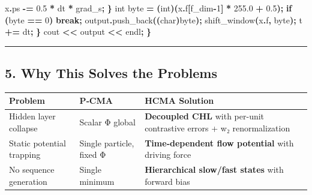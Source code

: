 \documentclass[
  11pt,
  a4paper,
]{article}
\newenvironment{Shaded}{\begin{snugshade}}{\end{snugshade}}
\newcommand{\ControlFlowTok}[1]{\textcolor[rgb]{0.13,0.29,0.53}{\textbf{#1}}}
\newcommand{\DataTypeTok}[1]{\textcolor[rgb]{0.13,0.29,0.53}{#1}}
\newcommand{\DecValTok}[1]{\textcolor[rgb]{0.00,0.00,0.81}{#1}}
\newcommand{\FloatTok}[1]{\textcolor[rgb]{0.00,0.00,0.81}{#1}}
\newcommand{\NormalTok}[1]{#1}
\newcommand{\OperatorTok}[1]{\textcolor[rgb]{0.81,0.36,0.00}{\textbf{#1}}}
\begin{document}
\begin{Shaded}
\begin{Highlighting}[]
\NormalTok{            x}\OperatorTok{.}\NormalTok{ps }\OperatorTok{{-}=} \FloatTok{0.5} \OperatorTok{*}\NormalTok{ dt }\OperatorTok{*}\NormalTok{ grad\_s}\OperatorTok{;}
        \OperatorTok{\}}
        \DataTypeTok{int}\NormalTok{ byte }\OperatorTok{=} \OperatorTok{(}\DataTypeTok{int}\OperatorTok{)(}\NormalTok{x}\OperatorTok{.}\NormalTok{f}\OperatorTok{[}\NormalTok{f\_dim}\OperatorTok{{-}}\DecValTok{1}\OperatorTok{]} \OperatorTok{*} \FloatTok{255.0} \OperatorTok{+} \FloatTok{0.5}\OperatorTok{);}
        \ControlFlowTok{if} \OperatorTok{(}\NormalTok{byte }\OperatorTok{==} \DecValTok{0}\OperatorTok{)} \ControlFlowTok{break}\OperatorTok{;}
\NormalTok{        output}\OperatorTok{.}\NormalTok{push\_back}\OperatorTok{((}\DataTypeTok{char}\OperatorTok{)}\NormalTok{byte}\OperatorTok{);}
\NormalTok{        shift\_window}\OperatorTok{(}\NormalTok{x}\OperatorTok{.}\NormalTok{f}\OperatorTok{,}\NormalTok{ byte}\OperatorTok{);}
\NormalTok{        t }\OperatorTok{+=}\NormalTok{ dt}\OperatorTok{;}
    \OperatorTok{\}}
\NormalTok{    cout }\OperatorTok{\textless{}\textless{}}\NormalTok{ output }\OperatorTok{\textless{}\textless{}}\NormalTok{ endl}\OperatorTok{;}
\OperatorTok{\}}
\end{Highlighting}
\end{Shaded}

\begin{center}\rule{0.5\linewidth}{0.5pt}\end{center}

\subsection{5. Why This Solves the
Problems}\label{why-this-solves-the-problems}

\begin{longtable}[]{@{}
  >{\raggedright\arraybackslash}p{}
  >{\raggedright\arraybackslash}p{}
  >{\raggedright\arraybackslash}p{}@{}}
\toprule\noalign{}
\begin{minipage}[b]{\linewidth}\raggedright
Problem
\end{minipage} & \begin{minipage}[b]{\linewidth}\raggedright
P‑CMA
\end{minipage} & \begin{minipage}[b]{\linewidth}\raggedright
HCMA Solution
\end{minipage} \\
\midrule\noalign{}
\endhead
\bottomrule\noalign{}
\endlastfoot
Hidden layer collapse & Scalar Φ global & \textbf{Decoupled CHL} with
per-unit contrastive errors + w₂ renormalization \\
Static potential trapping & Single particle, fixed Φ &
\textbf{Time‑dependent flow potential} with driving force \\
No sequence generation & Single minimum & \textbf{Hierarchical slow/fast
states} with forward bias \\
\end{longtable}
\end{document}
